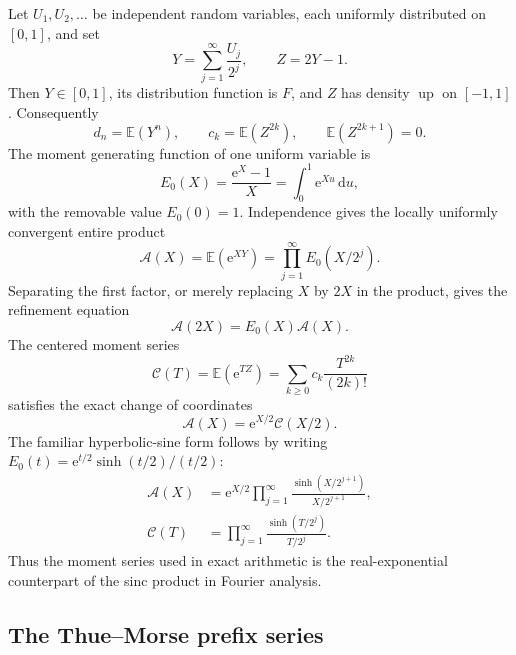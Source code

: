 \documentclass[11pt,oneside]{article}
\theoremstyle{definition}
\theoremstyle{remark}
\newcommand{\Up}{\operatorname{up}}
\newcommand{\e}{\mathrm e}
\newcommand{\dd}{\,\mathrm d}
\newcommand{\E}{\mathbb E}
\begin{document}
Let $U_1,U_2,\ldots$ be independent random variables, each uniformly distributed on
$[0,1]$, and set
\begin{equation}
 Y=\sum_{j=1}^{\infty}\frac{U_j}{2^j},
 \qquad Z=2Y-1.                                             \label{eq:Y-Z-def}
\end{equation}
Then $Y\in[0,1]$, its distribution function is $F$, and $Z$ has density $\Up$ on $[-1,1]$.
Consequently
\begin{equation}
 d_n=\E(Y^n),\qquad c_k=\E(Z^{2k}),\qquad \E(Z^{2k+1})=0. \label{eq:prob-moments}
\end{equation}
The moment generating function of one uniform variable is
\[
 E_0(X)=\frac{\e^X-1}{X}=\int_0^1\e^{Xu}\dd u,
\]
with the removable value $E_0(0)=1$.  Independence gives the locally uniformly convergent
entire product
\begin{equation}
 \mathscr A(X)=\E(\e^{XY})
 =\prod_{j=1}^{\infty}E_0(X/2^j).                          \label{eq:A-product}
\end{equation}
Separating the first factor, or merely replacing $X$ by $2X$ in the product, gives the
refinement equation
\begin{equation}
 \mathscr A(2X)=E_0(X)\mathscr A(X).                       \label{eq:A-refinement}
\end{equation}
The centered moment series
\begin{equation}
 \mathscr C(T)=\E(\e^{TZ})
 =\sum_{k\ge0}c_k\frac{T^{2k}}{(2k)!}                     \label{eq:C-def}
\end{equation}
satisfies the exact change of coordinates
\begin{equation}
 \boxed{\mathscr A(X)=\e^{X/2}\mathscr C(X/2).}           \label{eq:A-C-transform}
\end{equation}
The familiar hyperbolic-sine form follows by writing
$E_0(t)=\e^{t/2}\sinh(t/2)/(t/2)$:
\begin{align}
 \mathscr A(X)
 &=\e^{X/2}\prod_{j=1}^{\infty}
   \frac{\sinh(X/2^{j+1})}{X/2^{j+1}},                    \label{eq:A-sinh-product}\\
 \mathscr C(T)
 &=\prod_{j=1}^{\infty}\frac{\sinh(T/2^j)}{T/2^j}.        \label{eq:C-sinh-product}
\end{align}
Thus the moment series used in exact arithmetic is the real-exponential counterpart of the
sinc product in Fourier analysis.

\subsection{The Thue--Morse prefix series}
\end{document}

